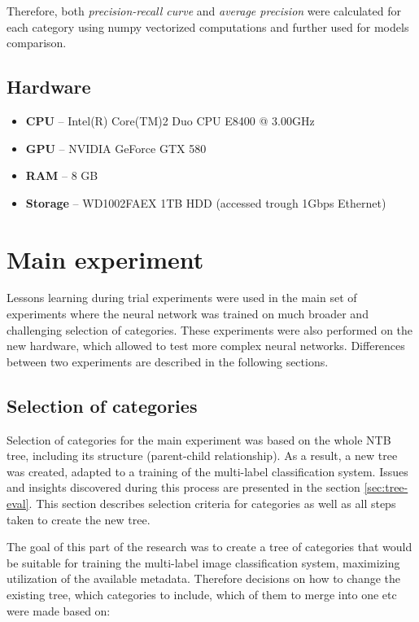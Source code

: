    Therefore, both \textit{precision-recall curve} and \textit{average precision} were calculated for each category using numpy vectorized computations and further used for models comparison.
    
    \subsection{Hardware}
    \label{sec:trial-hw}
    \begin{itemize}
        \item \textbf{CPU} -- Intel(R) Core(TM)2 Duo CPU E8400 @ 3.00GHz
        \item \textbf{GPU} -- NVIDIA GeForce GTX 580
        \item \textbf{RAM} -- 8 GB
        \item \textbf{Storage} -- WD1002FAEX 1TB HDD (accessed trough 1Gbps Ethernet)
    \end{itemize}


\section{Main experiment}
    Lessons learning during trial experiments were used in the main set of experiments where the neural network was trained on much broader and challenging selection of categories. These experiments were also performed on the new hardware, which allowed to test more complex neural networks. Differences between two experiments are described in the following sections.
    
    \subsection{Selection of categories}
    Selection of categories for the main experiment was based on the whole NTB tree, including its structure (parent-child relationship). As a result, a new tree was created, adapted to a training of the multi-label classification system. Issues and insights discovered during this process are presented in the section \ref{sec:tree-eval}. This section describes selection criteria for categories as well as all steps taken to create the new tree.
    
    The goal of this part of the research was to create a tree of categories that would be suitable for training the multi-label image classification system, maximizing utilization of the available metadata. Therefore decisions on how to change the existing tree, which categories to include, which of them to merge into one etc were made based on:
    
